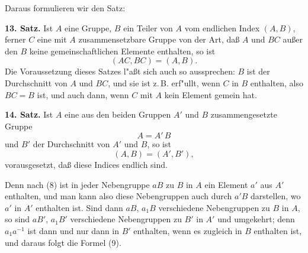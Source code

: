 \documentclass[12pt,a4paper]{article}
\theoremstyle{plain}
\begin{document}
Daraus formulieren wir den Satz:

\textbf{13. Satz.} Ist $A$ eine Gruppe, $B$ ein Teiler von $A$ vom endlichen Index $(A, B)$, ferner $C$ eine mit $A$ zusammensetzbare Gruppe von der Art, da\ss{} $A$ und $BC$ au\ss er den $B$ keine gemeinschaftlichen Elemente enthalten, so ist
\begin{equation}
(AC, BC) = (A, B).
\tag{7}
\end{equation}
Die Voraussetzung dieses Satzes l"a\ss t sich auch so aussprechen: $B$ ist der Durchschnitt von $A$ und $BC$, und sie ist z.\,B. erf"ullt, wenn $C$ in $B$ enthalten, also $BC = B$ ist, und auch dann, wenn $C$ mit $A$ kein Element gemein hat.

\textbf{14. Satz.} Ist $A$ eine aus den beiden Gruppen $A'$ und $B$ zusammengesetzte Gruppe
\begin{equation}
A = A'\,B
\tag{8}
\end{equation}
und $B'$ der Durchschnitt von $A'$ und $B$, so ist
\begin{equation}
(A, B) = (A', B'),
\tag{9}
\end{equation}
vorausgesetzt, da\ss{} diese Indices endlich sind.

Denn nach (8) ist in jeder Nebengruppe $aB$ zu $B$ in $A$ ein Element $a'$ aus $A'$ enthalten, und man kann also diese Nebengruppen auch durch $a'B$ darstellen, wo $a'$ in $A'$ enthalten ist. Sind dann $aB$, $a_1B$ verschiedene Nebengruppen zu $B$ in $A$, so sind $aB'$, $a_1B'$ verschiedene Nebengruppen zu $B'$ in $A'$ und umgekehrt; denn $a_1 a^{-1}$ ist dann und nur dann in $B'$ enthalten, wenn es zugleich in $B$ enthalten ist, und daraus folgt die Formel (9).
\end{document}
